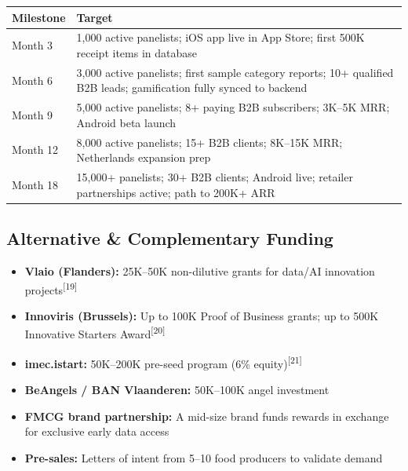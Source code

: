\documentclass[11pt,a4paper]{article}
\begin{document}
\begin{center}
\renewcommand{\arraystretch}{1.3}
\begin{tabularx}{\textwidth}{C{2.5cm} L{11cm}}
\toprule
{}
\textbf{\color{white}Milestone} & \textbf{\color{white}Target} \\
\midrule
Month 3 & 1,000 active panelists; iOS app live in App Store; first 500K receipt items in database \\
Month 6 & 3,000 active panelists; first sample category reports; 10+ qualified B2B leads; gamification fully synced to backend \\
Month 9 & 5,000 active panelists; 8+ paying B2B subscribers; \texteuro{}3K--5K MRR; Android beta launch \\
Month 12 & 8,000 active panelists; 15+ B2B clients; \texteuro{}8K--15K MRR; Netherlands expansion prep \\
Month 18 & 15,000+ panelists; 30+ B2B clients; Android live; retailer partnerships active; path to \texteuro{}200K+ ARR \\
\bottomrule
\end{tabularx}
\end{center}

\subsection{Alternative \& Complementary Funding}

\begin{itemize}[leftmargin=1.5em, itemsep=3pt]
  \item \textbf{Vlaio (Flanders):} \texteuro{}25K--50K non-dilutive grants for data/AI innovation projects\textsuperscript{[19]}
  \item \textbf{Innoviris (Brussels):} Up to \texteuro{}100K Proof of Business grants; up to \texteuro{}500K Innovative Starters Award\textsuperscript{[20]}
  \item \textbf{imec.istart:} \texteuro{}50K--200K pre-seed program (6\% equity)\textsuperscript{[21]}
  \item \textbf{BeAngels / BAN Vlaanderen:} \texteuro{}50K--100K angel investment
  \item \textbf{FMCG brand partnership:} A mid-size brand funds rewards in exchange for exclusive early data access
  \item \textbf{Pre-sales:} Letters of intent from 5--10 food producers to validate demand
\end{itemize}
\end{document}
